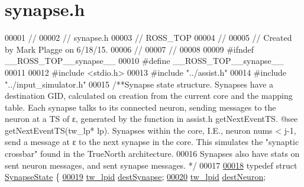 \hypertarget{synapse_8h_source}{}\section{synapse.\+h}
\label{synapse_8h_source}

\begin{DoxyCode}
00001 \textcolor{comment}{//}
00002 \textcolor{comment}{//  synapse.h}
00003 \textcolor{comment}{//  ROSS\_TOP}
00004 \textcolor{comment}{//}
00005 \textcolor{comment}{//  Created by Mark Plagge on 6/18/15.}
00006 \textcolor{comment}{//}
00007 \textcolor{comment}{//}
00008 
00009 \textcolor{preprocessor}{#}\textcolor{preprocessor}{ifndef} \textcolor{preprocessor}{\_\_ROSS\_TOP\_\_synapse\_\_}
00010 \textcolor{preprocessor}{#}\textcolor{preprocessor}{define} \textcolor{preprocessor}{\_\_ROSS\_TOP\_\_synapse\_\_}
00011 
00012 \textcolor{preprocessor}{#}\textcolor{preprocessor}{include} \textcolor{preprocessor}{<}\textcolor{preprocessor}{stdio}\textcolor{preprocessor}{.}\textcolor{preprocessor}{h}\textcolor{preprocessor}{>}
00013 \textcolor{preprocessor}{#}\textcolor{preprocessor}{include} \textcolor{preprocessor}{"../assist.h"}
00014 \textcolor{preprocessor}{#}\textcolor{preprocessor}{include} \textcolor{preprocessor}{"../input\_simulator.h"}
00015 \textcolor{comment}{/**Synapse state structure. Synapses have a destination GID, calculated on creation from the current
       core and the mapping table. Each synapse talks to its connected neuron, sending messages to the neuron at a
       TS of ε, generated by the function in assist.h getNextEventTS. @see getNextEventTS(tw\_lp* lp). Synapses
       within the core, I.E., neuron nums < j-1, send a message at ε to the next synapse in the core. This simulates the
       "synaptic crossbar" found in the TrueNorth architecture.}
00016 \textcolor{comment}{ Synapses also have stats on sent neuron messages, and sent synapse messages. */}
00017 
\hypertarget{synapse_8h_source_l00018}{}\hyperlink{structsynapse_state}{00018} \textcolor{keyword}{typedef} \textcolor{keyword}{struct} \hyperlink{structsynapse_state}{SynapseState} \{
\hypertarget{synapse_8h_source_l00019}{}\hyperlink{structsynapse_state_a665999819b255f36d756f17b85bc9a03}{00019}     \hyperlink{structsynapse_state_a665999819b255f36d756f17b85bc9a03}{tw\_lpid} \hyperlink{structsynapse_state_a665999819b255f36d756f17b85bc9a03}{destSynapse};
\hypertarget{synapse_8h_source_l00020}{}\hyperlink{structsynapse_state_a0710dca002b4b3a3f7ae72633bef3691}{00020}     \hyperlink{structsynapse_state_a0710dca002b4b3a3f7ae72633bef3691}{tw\_lpid} \hyperlink{structsynapse_state_a0710dca002b4b3a3f7ae72633bef3691}{destNeuron};

\end{DoxyCode}
